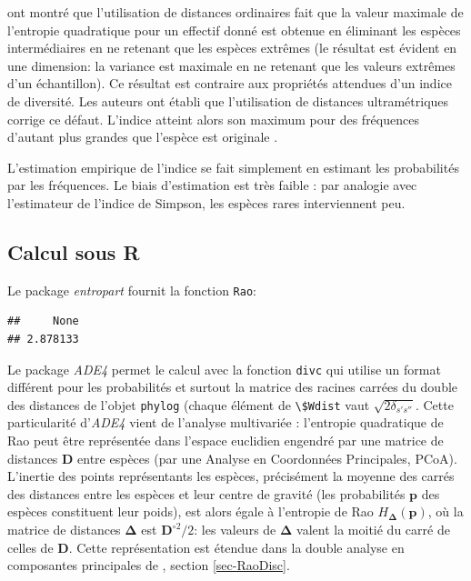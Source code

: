 \documentclass[
  11pt,
  french,
  a4paper,
  extrafontsizes,onecolumn,openright
  ]{memoir}
\newenvironment{Shaded}{\begin{snugshade}}{\end{snugshade}}
\newcommand{\CommentTok}[1]{\textcolor[rgb]{0.56,0.35,0.01}{\textit{#1}}}
\newcommand{\FunctionTok}[1]{\textcolor[rgb]{0.13,0.29,0.53}{\textbf{#1}}}
\newcommand{\NormalTok}[1]{#1}
\newcommand{\OtherTok}[1]{\textcolor[rgb]{0.56,0.35,0.01}{#1}}
\newcommand{\SpecialCharTok}[1]{\textcolor[rgb]{0.81,0.36,0.00}{\textbf{#1}}}
\begin{document}
\textcite{Pavoine2005c} ont montré que l'utilisation de distances ordinaires fait que la valeur maximale de l'entropie quadratique pour un effectif donné est obtenue en éliminant les espèces intermédiaires en ne retenant que les espèces extrêmes (le résultat est évident en une dimension: la variance est maximale en ne retenant que les valeurs extrêmes d'un échantillon).
Ce résultat est contraire aux propriétés attendues d'un indice de diversité.
Les auteurs ont établi que l'utilisation de distances ultramétriques corrige ce défaut.
L'indice atteint alors son maximum pour des fréquences d'autant plus grandes que l'espèce est originale \autocite{Pavoine2005a}.

L'estimation empirique de l'indice se fait simplement en estimant les probabilités par les fréquences.
Le biais d'estimation est très faible \autocite{Marcon2014a}: par analogie avec l'estimateur de l'indice de Simpson, les espèces rares interviennent peu.

\subsection{Calcul sous R}\label{calcul-sous-r}

Le package \emph{entropart} fournit la fonction \texttt{Rao}:

\scriptsize

\begin{Shaded}
\end{Shaded}

\begin{verbatim}
##     None 
## 2.878133
\end{verbatim}

\normalsize

Le package \emph{ADE4} permet le calcul avec la fonction \texttt{divc} qui utilise un format différent pour les probabilités et surtout la matrice des racines carrées du double des distances de l'objet \texttt{phylog} (chaque élément de \texttt{\textbackslash{}\$Wdist} vaut \(\sqrt{2\delta_{s's''}}\).
Cette particularité d'\emph{ADE4} vient de l'analyse multivariée \autocite{Champely2002}: l'entropie quadratique de Rao peut être représentée dans l'espace euclidien engendré par une matrice de distances \(\mathbf{D}\) entre espèces (par une Analyse en Coordonnées Principales, PCoA).
L'inertie des points représentants les espèces, précisément la moyenne des carrés des distances entre les espèces et leur centre de gravité (les probabilités \(\mathbf{p}\) des espèces constituent leur poids), est alors égale à l'entropie de Rao \(H_{\mathbf{\Delta}}\left(\mathbf{p}\right)\), où la matrice de distances \(\mathbf{\Delta}\) est \({\mathbf{D}^{\circ2}}/{2}\): les valeurs de \(\mathbf{\Delta}\) valent la moitié du carré de celles de \(\mathbf{D}\).
Cette représentation est étendue dans la double analyse en composantes principales de \textcite{Pavoine2004}, section \ref{sec-RaoDisc}.
\end{document}

